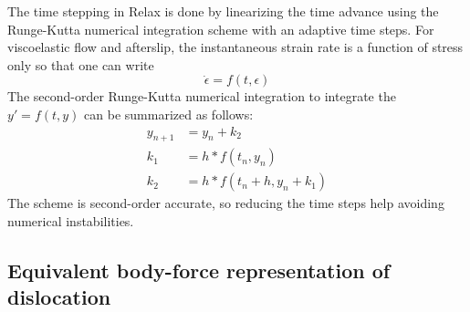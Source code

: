 \documentclass[10pt]{article}
\begin{document}
The time stepping in Relax is done by linearizing the time advance using the Runge-Kutta numerical integration scheme with an adaptive time steps.
For viscoelastic flow and afterslip, the instantaneous strain rate is a function of stress only so that one can write
\begin{equation}
\dot{\epsilon} = f(t,\epsilon)
\end{equation}
The second-order Runge-Kutta numerical integration to integrate the $y'=f(t,y)$ can be summarized as follows:
\begin{equation}
\begin{aligned}
y_{n+1} &= y_n + k_2\\
k_1 &= h * f(t_n, y_n)\\
k_2 &= h * f(t_n + h, y_n + k_1)
\end{aligned}
\end{equation}
The scheme is second-order accurate, so reducing the time steps help avoiding numerical instabilities.

\subsection{Equivalent body-force representation of dislocation}
\end{document}
